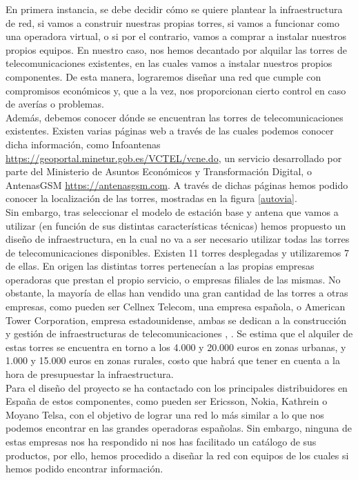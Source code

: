 En primera instancia, se debe decidir cómo se quiere plantear la infraestructura de red, si vamos a construir nuestras propias torres, si vamos a funcionar como una operadora virtual, o si por el contrario, vamos a comprar a instalar nuestros propios equipos. En nuestro caso, nos hemos decantado por alquilar las torres de telecomunicaciones existentes, en las cuales vamos a instalar nuestros propios componentes. De esta manera, lograremos diseñar una red que cumple con compromisos económicos y, que a la vez, nos proporcionan cierto control en caso de averías o problemas.\\

Además, debemos conocer dónde se encuentran las torres de telecomunicaciones existentes. Existen varias páginas web a través de las cuales podemos conocer dicha información, como Infoantenas \url{https://geoportal.minetur.gob.es/VCTEL/vcne.do}, un servicio desarrollado por parte del Ministerio de Asuntos Económicos y Transformación Digital, o AntenasGSM \url{https://antenasgsm.com}. A través de dichas páginas hemos podido conocer la localización de las torres, mostradas en la figura \ref{autovia}.\\

Sin embargo, tras seleccionar el modelo de estación base y antena que vamos a utilizar (en función de sus distintas características técnicas) hemos propuesto un diseño de infraestructura, en la cual no va a ser necesario utilizar todas las torres de telecomunicaciones disponibles. Existen 11 torres desplegadas y utilizaremos 7 de ellas. En origen las distintas torres pertenecían a las propias empresas operadoras que prestan el propio servicio, o empresas filiales de las mismas. No obstante, la mayoría de ellas han vendido una gran cantidad de las torres a otras empresas, como pueden ser Cellnex Telecom, una empresa española, o American Tower Corporation, empresa estadounidense, ambas se dedican a la construcción y gestión de infraestructuras de telecomunicaciones \cite{elmundo2021}, \cite{heraldodiariodesoria2019}. Se estima que el alquiler de estas torres se encuentra en torno a los 4.000 y 20.000 euros en zonas urbanas, y 1.000 y 15.000 euros en zonas rurales, costo que habrá que tener en cuenta a la hora de presupuestar la infraestructura.\\

Para el diseño del proyecto se ha contactado con los principales distribuidores en España de estos componentes, como pueden ser Ericsson, Nokia, Kathrein o Moyano Telsa, con el objetivo de lograr una red lo más similar a lo que nos podemos encontrar en las grandes operadoras españolas. Sin embargo, ninguna de estas empresas nos ha respondido ni nos has facilitado un catálogo de sus productos, por ello, hemos procedido a diseñar la red con equipos de los cuales si hemos podido encontrar información. \\

